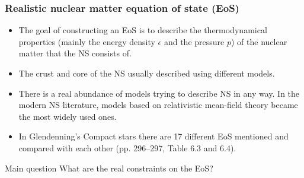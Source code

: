 \begin{frame}
\frametitle{Realistic nuclear matter equation of state (EoS)}

\begin{itemize}
	\item The goal of constructing an EoS is to describe the thermodynamical properties (mainly the energy density $\epsilon$ and the pressure $p$) of the nuclear matter that the NS consists of.
	\item The crust and core of the NS usually described using different models.
	\item There is a real abundance of models trying to describe NS in any way. In the modern NS literature, models based on relativistic mean-field theory became the most widely used ones.
	\item In Glendenning's Compact stars there are 17 different EoS mentioned and compared with each other (pp. 296--297, Table 6.3 and 6.4).
\end{itemize}
\begin{alertblock}{Main question}
	\centering	
	What are the real constraints on the EoS?
\end{alertblock}

\end{frame}
